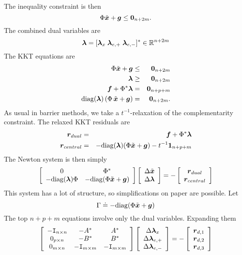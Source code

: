 The inequality constraint is then $$\Phi \tilde {{\boldsymbol{x}}} + \boldsymbol{g} \le \boldsymbol{0}_{n+2m}.$$
The combined dual variables are 
\begin{equation}
\boldsymbol{\lambda} = [ \boldsymbol{\lambda}_{x} \; \boldsymbol{\lambda}_{e,+} \; \boldsymbol{\lambda}_{e,-} ]^* \in \mathbb R^{n+2m}
\end{equation}
The KKT equations are 
\begin{eqnarray}
\Phi \tilde {{\boldsymbol{x}}} + \boldsymbol{g} &\le& \boldsymbol{0}_{n+2m} \\
\boldsymbol{\lambda} &\ge& \boldsymbol{0}_{n+2m} \\
\boldsymbol{f} + \Phi^* \boldsymbol{\lambda} &=& \boldsymbol{0}_{n+p+m} \\
\mathrm{diag}(\boldsymbol{\lambda}) \,( \Phi \, \tilde {{\boldsymbol{x}}} + \boldsymbol{g}) &=& \boldsymbol{0}_{n + 2m}.
\end{eqnarray}
As usual in barrier methods, we take a $t^{-1}$-relaxation of the complementarity constraint. The relaxed KKT residuals are 
\begin{eqnarray}
\boldsymbol{r}_{dual}  &=&  \boldsymbol{f} + \Phi^* \boldsymbol{\lambda} \\
\boldsymbol{r}_{central} &=& -\mathrm{diag}(\boldsymbol{\lambda}) (\Phi \tilde {{\boldsymbol{x}}} + \boldsymbol{g}) - t^{-1} {\boldsymbol{1}}_{n+p+m}
\end{eqnarray}
The Newton system is then simply
\begin{equation}
\left[ \begin{array}{cc} 0 & \Phi^* \\ - \mathrm{diag}(\boldsymbol{\lambda}) \Phi & -\mathrm{diag}(\Phi \tilde {{\boldsymbol{x}}} + \boldsymbol{g}) \end{array} \right] \left[ \begin{array}{c} \Delta \tilde {{\boldsymbol{x}}} \\ \Delta \boldsymbol{\lambda} \end{array} \right] = - \left[ \begin{array}{c} \boldsymbol{r}_{dual} \\ \boldsymbol{r}_{central} \end{array} \right]
\end{equation}
This system has a lot of structure, so simplifications on paper are possible. Let
$$\Gamma \doteq - \mathrm{diag}(\Phi \tilde {{\boldsymbol{x}}} + \boldsymbol{g})$$
The top $n+p+m$ equations involve only the dual variables. Expanding them
\begin{equation} \label{eqn:d-lambda-only}
\left[ \begin{array}{ccc} -\mathtt{I}_{n\times n} &  -A^* & A^* \\  0_{p \times n} & -B^* & B^* \\ 
0_{m \times n} & -\mathtt{I}_{m \times m} & -\mathtt{I}_{m \times m} \end{array} \right] \left[ \begin{array}{c} \Delta \boldsymbol{\lambda}_{x} \\ \Delta \boldsymbol{\lambda}_{e,+} \\ \Delta \boldsymbol{\lambda}_{e,-} \end{array} \right] = - \left[ \begin{array}{c} \boldsymbol{r}_{d,1} \\ \boldsymbol{r}_{d,2} \\ \boldsymbol{r}_{d,3} \end{array} \right]
\end{equation}
